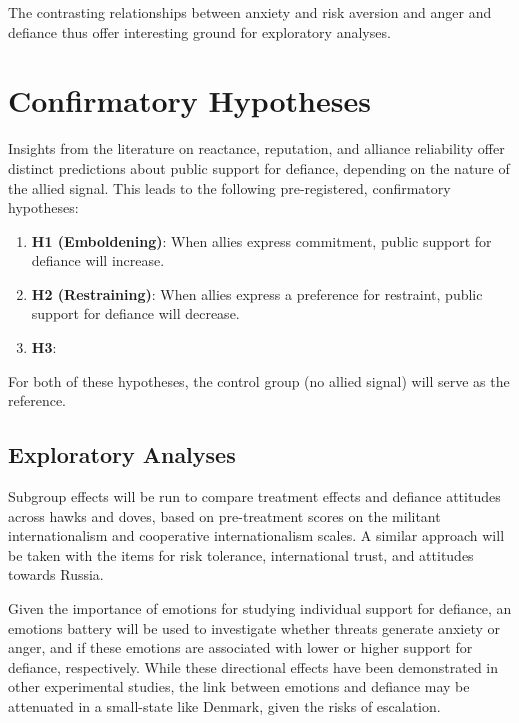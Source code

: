 The contrasting relationships between anxiety and risk aversion \autocite{huddy_threat_2005, wagner_anxiety_2019} and anger and defiance \autocite{shandler_cyber_2021, fisk_emotions_2019, powers_psychology_2023} thus offer interesting ground for exploratory analyses. 



\section{Confirmatory Hypotheses}
Insights from the literature on reactance, reputation, and alliance reliability offer distinct predictions about public support for defiance, depending on the nature of the allied signal. This leads to the following pre-registered, confirmatory hypotheses:
\begin{enumerate}
    \item \textbf{H1 (Emboldening)}: When allies express commitment, public support for defiance will increase. 
    \item \textbf{H2 (Restraining)}: When allies express a preference for restraint, public support for defiance will decrease. 
    \item \textbf{H3}: 
\end{enumerate}

For both of these hypotheses, the control group (no allied signal) will serve as the reference. 

\subsection{Exploratory Analyses}
Subgroup effects will be run to compare treatment effects and defiance attitudes across hawks and doves, based on pre-treatment scores on the militant internationalism and cooperative internationalism scales. A similar approach will be taken with the items for risk tolerance,  international trust, and attitudes towards Russia. 

Given the importance of emotions for studying individual support for defiance, an emotions battery will be used to investigate whether threats generate anxiety or anger, and if these emotions are associated with lower or higher support for defiance, respectively. While these directional effects have been demonstrated in other experimental studies, the link between emotions and defiance may be attenuated in a small-state like Denmark, given the risks of escalation. 

